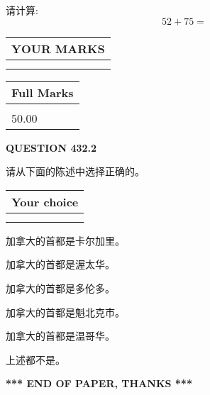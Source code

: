 \documentclass{ctexart}
\begin{document}
  
 
请计算:
\begin{equation}
52 +  %
75 = \nonumber
\end{equation}
 

 

 
  
\vspace{0.2in}
  
\noindent\begin{tabular}{|l|}
\hline
 YOUR MARKS  \\
\hline
 \\ 
 \\ 
\hline
\end{tabular}
\hspace{0.05in} \begin{tabular}{|l|}
\hline
 Full Marks  \\
\hline
 \\ 
50.00 \\
\hline
\end{tabular}
{\textbf{\Large{QUESTION
432.2 
}}}
  
  
请从下面的陈述中选择正确的。
  
  
\noindent\hspace{3.0in} \begin{tabular}{|l|}
\hline
Your choice \\
\hline
 \\ 
 \\ 
\hline
\end{tabular}
  
  
 
 
加拿大的首都是卡尔加里。
 
 
加拿大的首都是渥太华。
 
 
加拿大的首都是多伦多。
 
 
加拿大的首都是魁北克市。
 
 
加拿大的首都是温哥华。
 
 
 上述都不是。
 
 
   
   
 \vspace{0.2in}
 
   
   
   
   
\vspace{1.0in} 
{\textbf{\large{ *** END OF PAPER, THANKS *** }}} 
   
\end{document}
